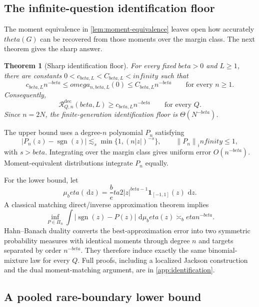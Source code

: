 \documentclass[11pt]{article}
\def\beta{beta}%
\def\theta{theta}%
\def\omega{omega}%
\def\infty{infinity}%
\newtheorem{theorem}{Theorem}[section]
\newcommand{\one}{\mathbf 1}
\newcommand{\sgn}{\operatorname{sgn}}
\newcommand{\calR}{\mathcal R}
\newcommand{\norm}[1]{\left\lVert#1\right\rVert}
\newcommand{\dd}{\,\mathrm d}
\newcommand\ced[1]{{\color{teal!70!black} #1}}
\begin{document}
\subsection{The infinite-question identification floor}

\ced{The moment equivalence in \cref{lem:moment-equivalence} leaves open how accurately $\theta(G)$ can be recovered from those moments over the margin class.  The next theorem gives the sharp answer.}

\begin{theorem}[Sharp identification floor]
\label{thm:identification-floor}
For every fixed $\beta>0$ and $L\ge1$, there are constants $0<c_{\beta,L}<C_{\beta,L}<\infty$ such that
\begin{equation}
\label{eq:identification-floor}
 c_{\beta,L}n^{-\beta}
\le
\omega_{n,\beta,L}(0)
\le
C_{\beta,L}n^{-\beta}
\qquad\text{for every }n\ge1.
\end{equation}
Consequently,
\begin{equation}
\label{eq:N-only-lower}
\calR^{\mathrm{dec}}_{Q,n}(\beta,L)
\ge c_{\beta,L}n^{-\beta}
\qquad\text{for every }Q.
\end{equation}
Since $n=2N$, the finite-generation identification floor is $\Theta(N^{-\beta})$.
\end{theorem}

The upper bound uses a degree-$n$ polynomial $P_n$ satisfying
\[
|P_n(z)-\sgn(z)|
\lesssim_s
\min\{1,(n|z|)^{-s}\},
\qquad \norm{P_n}_\infty\le1,
\]
with $s>\beta$.  Integrating over the margin class gives uniform error $O(n^{-\beta})$.  Moment-equivalent distributions integrate $P_n$ equally.

For the lower bound, let
\[
\mu_\beta(\dd z)
=
\frac\beta2|z|^{\beta-1}\one_{[-1,1]}(z)\,\dd z.
\]
A classical matching direct/inverse approximation theorem implies
\begin{equation}
\label{eq:weighted-L1}
\inf_{P\in\Pi_n}
\int|\sgn(z)-P(z)|\,\dd\mu_\beta(z)
\asymp_\beta n^{-\beta}.
\end{equation}
Hahn--Banach duality converts the best-approximation error into two symmetric probability measures with identical moments through degree $n$ and targets separated by order $n^{-\beta}$.  They therefore induce exactly the same binomial-mixture law for every $Q$.  Full proofs, including a localized Jackson construction and the dual moment-matching argument, are in \cref{app:identification}.

\subsection{A pooled rare-boundary lower bound}
\end{document}
